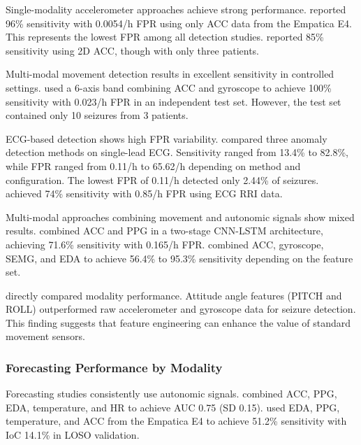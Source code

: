 Single-modality accelerometer approaches achieve strong performance. \textcite{spahrDeepLearningbasedDetection2025} reported 96\% sensitivity with 0.0054/h FPR using only ACC data from the Empatica E4. This represents the lowest FPR among all detection studies. \textcite{borujenyDetectionEpilepticSeizure2013} reported 85\% sensitivity using 2D ACC, though with only three patients.

Multi-modal movement detection results in excellent sensitivity in controlled settings. \textcite{fineDetectionKeyAutomated2025} used a 6-axis band combining ACC and gyroscope to achieve 100\% sensitivity with 0.023/h FPR in an independent test set. However, the test set contained only 10 seizures from 3 patients.

ECG-based detection shows high FPR variability. \textcite{reintjesECGBasedDetectionEpileptic2025} compared three anomaly detection methods on single-lead ECG. Sensitivity ranged from 13.4\% to 82.8\%, while FPR ranged from 0.11/h to 65.62/h depending on method and configuration. The lowest FPR of 0.11/h detected only 2.44\% of seizures. \textcite{odeDevelopmentEpilepticSeizure2023} achieved 74\% sensitivity with 0.85/h FPR using ECG RRI data.

Multi-modal approaches combining movement and autonomic signals show mixed results. \textcite{dongTwoLayerEnsembleMethod2022} combined ACC and PPG in a two-stage CNN-LSTM architecture, achieving 71.6\% sensitivity with 0.165/h FPR. \textcite{wangEpilepticSeizureDetection2025} combined ACC, gyroscope, SEMG, and EDA to achieve 56.4\% to 95.3\% sensitivity depending on the feature set.

\textcite{wangEpilepticSeizureDetection2025} directly compared modality performance. Attitude angle features (PITCH and ROLL) outperformed raw accelerometer and gyroscope data for seizure detection. This finding suggests that feature engineering can enhance the value of standard movement sensors.

\subsubsection{Forecasting Performance by Modality}

Forecasting studies consistently use autonomic signals. \textcite{nasseriAmbulatorySeizureForecasting2021} combined ACC, PPG, EDA, temperature, and HR to achieve AUC 0.75 (SD 0.15). \textcite{meiselMachineLearningWristband2020} used EDA, PPG, temperature, and ACC from the Empatica E4 to achieve 51.2\% sensitivity with IoC 14.1\% in LOSO validation.

